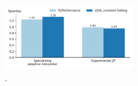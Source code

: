 
\begin{figure}[H]
    \centering
    \includegraphics[width=0.5\textwidth]{images/impact_cpython_optimisations/15_summary.pdf}
    \caption{.}
    \label{figure:impact-cpython-optimisations}
\end{figure}












